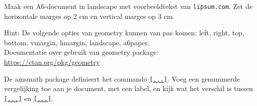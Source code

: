 \documentclass[a4paper]{article}
\begin{document}



\begin{exercise}[Geometry]\label{ex:aaaa}
    Maak een A6-document in landscape met voorbeeldtekst van \nolinkurl{lipsum.com}. Zet de
    horizontale marges op $ 2\text{ cm} $ en vertical marges op $ 3\text{ cm} $.

    Hint: De volgende opties van geometry kunnen van pas komen: left, right, top, bottom,
    vmargin, hmargin, landscape, a6paper.\\
    Documentatie over gebruik van geometry package: \url{https://ctan.org/pkg/geometry}
\end{exercise}

\begin{exercise}
    De amsmath package definieert het commando \texttt{\eqref{...}}.
    Voeg een genummerde vergelijking toe aan je document, met een label, en
    kijk wat het verschil is tussen \texttt{\ref{...}}
    en \texttt{\eqref{...}}.
\end{exercise}

\end{document}

